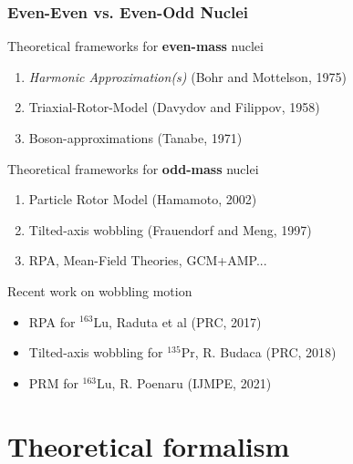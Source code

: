 \documentclass{beamer}
\begin{document}
\begin{frame}
  \frametitle{Even-Even vs. Even-Odd Nuclei}
\begin{block}{Theoretical frameworks for \textbf{even-mass} nuclei}
  \begin{enumerate}
    \item \emph{Harmonic Approximation(s)} (Bohr and Mottelson, 1975)
    \item Triaxial-Rotor-Model (Davydov and Filippov, 1958)
    \item Boson-approximations (Tanabe, 1971)
  \end{enumerate}
\end{block}

\begin{block}{Theoretical frameworks for \textbf{odd-mass} nuclei}
  \begin{enumerate}
    \item Particle Rotor Model (Hamamoto, 2002)
    \item Tilted-axis wobbling (Frauendorf and Meng, 1997)
    \item RPA, Mean-Field Theories, GCM+AMP...
  \end{enumerate}
\end{block}

\begin{exampleblock}{Recent work on wobbling motion}
  \begin{itemize}
    \item RPA for $^{163}$Lu, Raduta et al (PRC, 2017)
    \item Tilted-axis wobbling for $^{135}$Pr, R. Budaca (PRC, 2018)
    \item PRM for $^{163}$Lu, R. Poenaru (IJMPE, 2021)
  \end{itemize}
\end{exampleblock}

\end{frame}

\section{Theoretical formalism}

\end{document}
